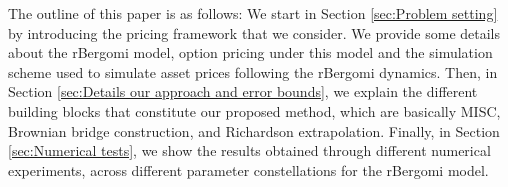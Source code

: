 The outline of this paper is as follows: We start in Section \ref{sec:Problem setting} by  introducing  the pricing framework that we consider. We provide some details about the rBergomi model, option pricing under this model and the simulation scheme used to simulate asset prices following the rBergomi dynamics. Then, in Section \ref{sec:Details our approach and error bounds}, we explain the different building blocks that constitute our proposed method, which are basically MISC, Brownian bridge construction, and Richardson extrapolation. Finally, in Section \ref{sec:Numerical tests}, we show the results obtained through different numerical experiments, across different parameter constellations for the rBergomi model. 


